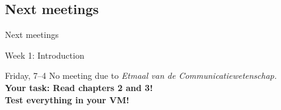 \documentclass{beamer}
\begin{document}
\subsection{Next meetings}
\begin{frame}
Next meetings
\end{frame}


\begin{frame}{Week 1: Introduction}

\begin{block}{Friday, 7--4}
No meeting due to \textit{Etmaal van de Communicatiewetenschap.}\\
\textbf{Your task: Read chapters 2 and 3! \\Test everything in your VM!}

\end{block}


\end{frame}
%
%
%
%
%
%	
%	
%
%
\end{document}
